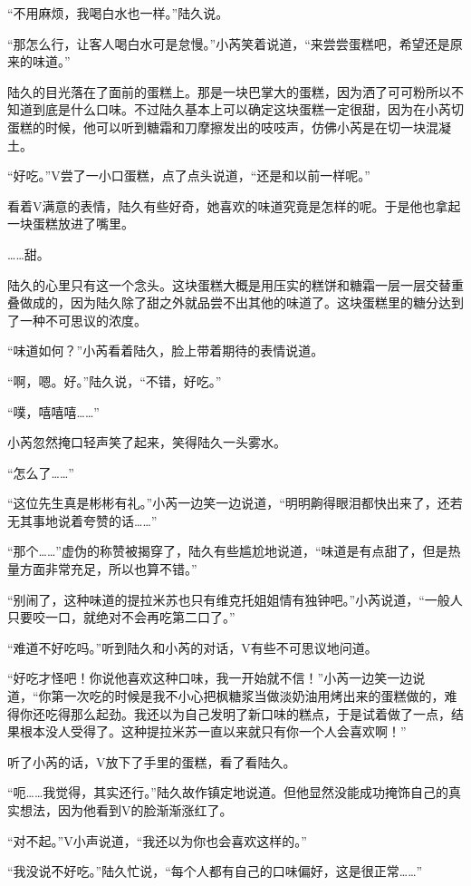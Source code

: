 “不用麻烦，我喝白水也一样。”陆久说。

“那怎么行，让客人喝白水可是怠慢。”小芮笑着说道，“来尝尝蛋糕吧，希望还是原来的味道。”

陆久的目光落在了面前的蛋糕上。那是一块巴掌大的蛋糕，因为洒了可可粉所以不知道到底是什么口味。不过陆久基本上可以确定这块蛋糕一定很甜，因为在小芮切蛋糕的时候，他可以听到糖霜和刀摩擦发出的吱吱声，仿佛小芮是在切一块混凝土。

“好吃。”V尝了一小口蛋糕，点了点头说道，“还是和以前一样呢。”

看着V满意的表情，陆久有些好奇，她喜欢的味道究竟是怎样的呢。于是他也拿起一块蛋糕放进了嘴里。

……甜。

陆久的心里只有这一个念头。这块蛋糕大概是用压实的糕饼和糖霜一层一层交替重叠做成的，因为陆久除了甜之外就品尝不出其他的味道了。这块蛋糕里的糖分达到了一种不可思议的浓度。

“味道如何？”小芮看着陆久，脸上带着期待的表情说道。

“啊，嗯。好。”陆久说，“不错，好吃。”

“噗，嘻嘻嘻……”

小芮忽然掩口轻声笑了起来，笑得陆久一头雾水。

“怎么了……”

“这位先生真是彬彬有礼。”小芮一边笑一边说道，“明明齁得眼泪都快出来了，还若无其事地说着夸赞的话……”

“那个……”虚伪的称赞被揭穿了，陆久有些尴尬地说道，“味道是有点甜了，但是热量方面非常充足，所以也算不错。”

“别闹了，这种味道的提拉米苏也只有维克托姐姐情有独钟吧。”小芮说道，“一般人只要咬一口，就绝对不会再吃第二口了。”

“难道不好吃吗。”听到陆久和小芮的对话，V有些不可思议地问道。

“好吃才怪吧！你说他喜欢这种口味，我一开始就不信！”小芮一边笑一边说道，“你第一次吃的时候是我不小心把枫糖浆当做淡奶油用烤出来的蛋糕做的，难得你还吃得那么起劲。我还以为自己发明了新口味的糕点，于是试着做了一点，结果根本没人受得了。这种提拉米苏一直以来就只有你一个人会喜欢啊！”

听了小芮的话，V放下了手里的蛋糕，看了看陆久。

“呃……我觉得，其实还行。”陆久故作镇定地说道。但他显然没能成功掩饰自己的真实想法，因为他看到V的脸渐渐涨红了。

“对不起。”V小声说道，“我还以为你也会喜欢这样的。”

“我没说不好吃。”陆久忙说，“每个人都有自己的口味偏好，这是很正常……”

